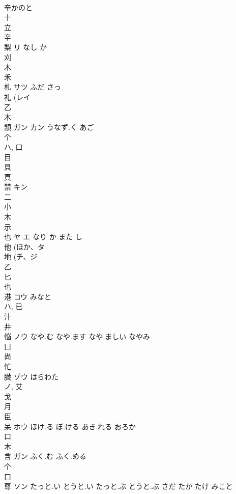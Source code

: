 \documentclass[8pt]{extreport}
\begin{document}
\begin{CJK}{UTF8}{min}
\\	辛かのと
\\	十 
\\	立 
\\	辛 
\\	梨	リ	なし か	
\\	刈 
\\	木 
\\	禾 
\\	札	サツ	ふだ さっ	
\\	礼 (レイ 
\\	乙 
\\	木 
\\	頷	ガン カン	うなず.く あご	
\\	个 
\\	ハ, 口 
\\	目 
\\	貝 
\\	頁 
\\	禁	キン		
\\	二 
\\	小 
\\	木 
\\	示 
\\	也	ヤ エ	なり か また し	
\\	他 (ほか、タ 
\\	地 (チ、ジ 
\\	乙 
\\	匕 
\\	也 
\\	港	コウ	みなと	
\\	ハ, 已 
\\	汁 
\\	井 
\\	悩	ノウ	なや.む なや.ます なや.ましい なやみ	
\\	凵 
\\	尚 
\\	忙 
\\	臓	ゾウ	はらわた	
\\	ノ, 艾 
\\	戈 
\\	月 
\\	臣 
\\	呆	ホウ	ほけ.る ぼ.ける あき.れる おろか	
\\	口 
\\	木 
\\	含	ガン	ふく.む ふく.める	
\\	个 
\\	口 
\\	尊	ソン	たっと.い とうと.い たっと.ぶ とうと.ぶ さだ たか たけ みこと	

\end{CJK}
\end{document}
